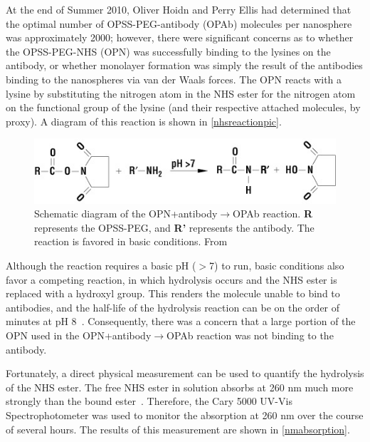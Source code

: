 At the end of Summer 2010, Oliver Hoidn and Perry Ellis had determined that the optimal number of OPSS-PEG-antibody (OPAb) molecules per nanosphere was approximately 2000; however, there were significant concerns as to whether the OPSS-PEG-NHS (OPN) was successfully binding to the lysines on the antibody, or whether monolayer formation was simply the result of the antibodies binding to the nanospheres via van der Waals forces. The OPN reacts with a lysine by substituting the nitrogen atom in the NHS ester for the nitrogen atom on the functional group of the lysine (and their respective attached molecules, by proxy). A diagram of this reaction is shown in \autoref{nhsreactionpic}.

\begin{figure}[htbp]
\centering
\includegraphics[keepaspectratio,width=\textwidth,height=0.75\textheight]{NHSreaction.jpg}
\caption{Schematic diagram of the OPN+antibody$\to$OPAb reaction. \textbf{R} represents the OPSS-PEG, and \textbf{R'} represents the antibody. The reaction is favored in basic conditions. From ~\citep{nhsreaction}}
\label{nhsreactionpic}
\end{figure}



Although the reaction requires a basic pH ($>$7) to run, basic conditions also favor a competing reaction, in which hydrolysis occurs and the NHS ester is replaced with a hydroxyl group. This renders the molecule unable to bind to antibodies, and the half-life of the hydrolysis reaction can be on the order of minutes at pH 8~\citep{nhshalflife}. Consequently, there was a concern that a large portion of the OPN used in the OPN+antibody$\to$OPAb reaction was not binding to the antibody.

Fortunately, a direct physical measurement can be used to quantify the hydrolysis of the NHS ester. The free NHS ester in solution absorbs at 260 nm much more strongly than the bound ester~\citep{Miron_Wilchek_1982}. Therefore, the Cary 5000 UV-Vis Spectrophotometer was used to monitor the absorption at 260 nm over the course of several hours. The results of this measurement are shown in \autoref{nmabsorption}.

